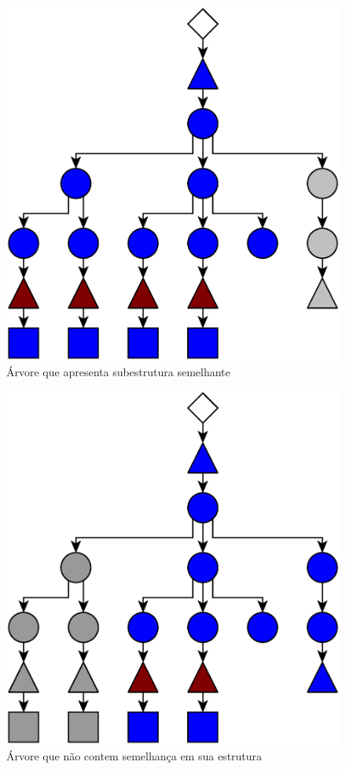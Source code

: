 \documentclass{beamer}
\begin{document}
\begin{frame}[allowframebreaks]
\newpage

  \begin{figure}[h]
    \includegraphics[scale=0.25]{img/tree2}
    \caption{Árvore que apresenta subestrutura semelhante}
  \end{figure}

\newpage

  \begin{figure}[h]
    \includegraphics[scale=0.25]{img/tree3}
    \caption{Árvore que não contem semelhança em sua estrutura}
  \end{figure}

\end{frame}
\end{document}
